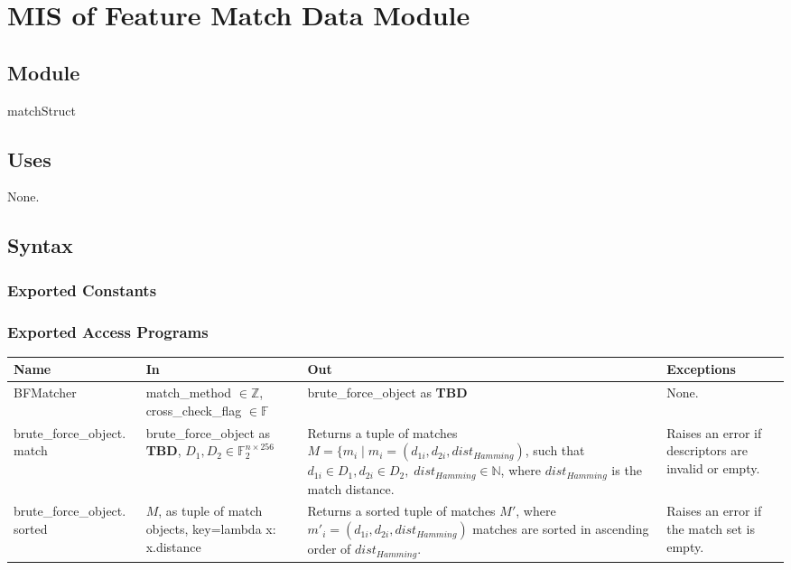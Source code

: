 \documentclass[12pt, titlepage]{article}
\begin{document}
\section{MIS of Feature Match Data Module} \label{mFMD}


\subsection{Module}

matchStruct

\subsection{Uses}
None.

\subsection{Syntax}

\subsubsection{Exported Constants}

\subsubsection{Exported Access Programs}

\begin{center}
  \begin{tabular}{p{4cm} p{4cm} p{5cm} p{3cm}}
  \hline
  \textbf{Name} & \textbf{In} & \textbf{Out} & \textbf{Exceptions} \\
  \hline
  BFMatcher & match\_method $\in \mathbb{Z}$, cross\_check\_flag $\in \mathbb{F}$ 
  & brute\_force\_object as \textbf{TBD}\newline 
  & None.\\
  \hline
  brute\_force\_object.\newline 
  match & brute\_force\_object as \textbf{TBD}, \newline
  $D_1, D_2 \in \mathbb{F}_{2}^{n\times 256}$ & 
  Returns a tuple of matches $M = \{ m_i \mid m_i = (d_{1i}, d_{2i}, dist_{Hamming})$, \newline
  such that $d_{1i} \in D_1, d_{2i} \in D_2, \; dist_{Hamming} \in \mathbb{N}$, 
  where $dist_{Hamming}$ is the match distance. & Raises an error if descriptors are 
  invalid or empty. \\
  \hline
  brute\_force\_object.\newline 
  sorted & $M$, as tuple of match objects, \newline
  key=lambda x: x.distance
  & Returns a sorted tuple of matches $M'$, where 
  $m'_i = (d_{1i}, d_{2i}, dist_{Hamming})$
  matches are sorted in ascending order of $dist_{Hamming}$. & Raises an 
  error if the match set is empty. \\
  \hline
  \end{tabular}
\end{center}
\end{document}
